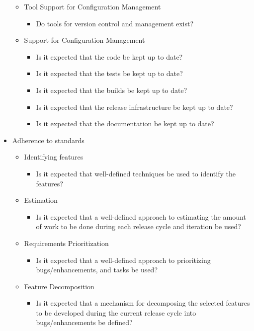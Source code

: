 \begin{appendices}
\begin{itemize}
		\begin{itemize}
			\item Tool Support for Configuration Management
				\begin{itemize}
					\item Do tools for version control and management exist?
				\end{itemize}
			\item Support for Configuration Management
				\begin{itemize}
					\item Is it expected that the code be kept up to date?
					\item Is it expected that the tests be kept up to date?
					\item Is it expected that the builds be kept up to date?
					\item Is it expected that the release infrastructure be kept up to date?
					\item Is it expected that the documentation be kept up to date?
				\end{itemize}
		\end{itemize}
	\item Adherence to standards
		\begin{itemize}
			\item Identifying features
				\begin{itemize}
					\item Is it expected that well-defined techniques be used to identify the features?
					\end{itemize}
			\item Estimation
				\begin{itemize}
					\item Is it expected that a well-defined approach to estimating the amount of work to be done during each release cycle and iteration be used?
				\end{itemize}
			\item Requirements Prioritization
				\begin{itemize}
					\item Is it expected that a well-defined approach to prioritizing bugs/enhancements, and tasks be used?
				\end{itemize}	
			\item Feature Decomposition
				\begin{itemize}
					\item Is it expected that a mechanism for decomposing the selected features to be developed during the current release cycle into bugs/enhancements be defined?

\end{itemize}
\end{itemize}
\end{itemize}
\end{appendices}
